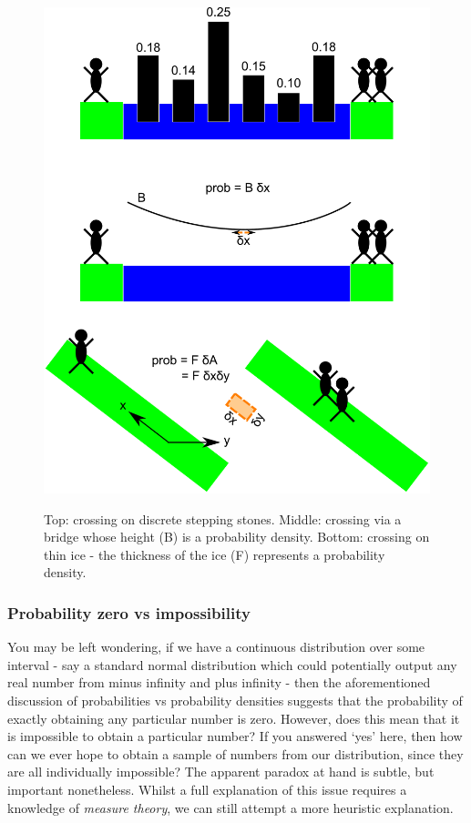 \documentclass[11pt,fullpage]{book}
\begin{document}
\begin{figure}
\centering
\scalebox{0.2} 
{\includegraphics{Probability_riverCrossing.pdf}}
\caption{Top: crossing on discrete stepping stones. Middle: crossing via a bridge whose height (B) is a probability density. Bottom: crossing on thin ice - the thickness of the ice (F) represents a probability density.}\label{fig:Probability_riverCrossing}
\end{figure}

\subsubsection{Probability zero vs impossibility}
You may be left wondering, if we have a continuous distribution over some interval - say a standard normal distribution which could potentially output any real number from minus infinity and plus infinity - then the aforementioned discussion of probabilities vs probability densities suggests that the probability of exactly obtaining any particular number is zero. However, does this mean that it is impossible to obtain a particular number? If you answered `yes' here, then how can we ever hope to obtain a sample of numbers from our distribution, since they are all individually impossible? The apparent paradox at hand is subtle, but important nonetheless. Whilst a full explanation of this issue requires a knowledge of \textit{measure theory}, we can still attempt a more heuristic explanation.
\end{document}
